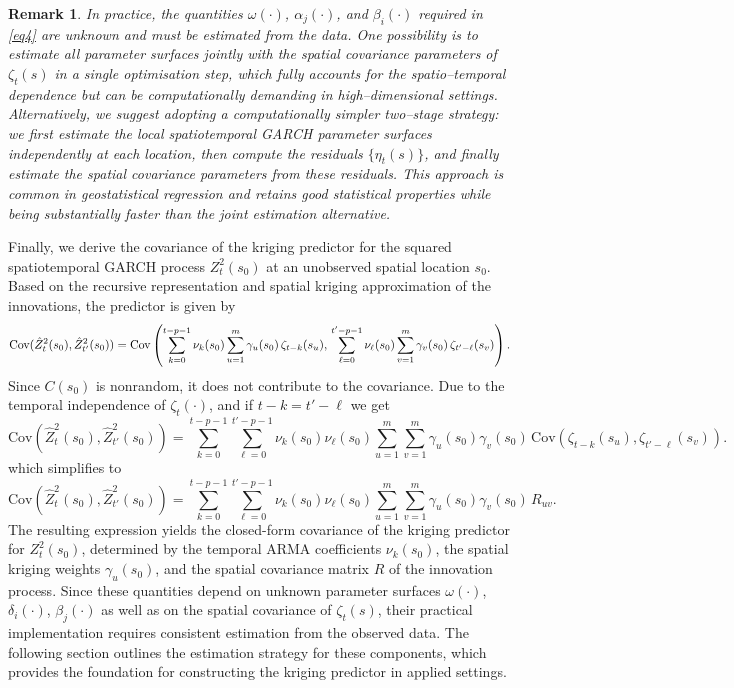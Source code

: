 \documentclass[fleqn,11pt]{article}
\newtheorem{remark}{Remark}
\begin{document}
\begin{remark}\label{rmk:2}
In practice, the quantities $\omega(\cdot)$, $\alpha_j(\cdot)$, and $\beta_i(\cdot)$ required in \eqref{eq4} are unknown and must be estimated from the data. One possibility is to estimate all parameter surfaces jointly with the spatial covariance parameters of $\zeta_t(s)$ in a single optimisation step, which fully accounts for the spatio–temporal dependence but can be computationally demanding in high–dimensional settings.  
Alternatively, we suggest adopting a computationally simpler two–stage strategy: we first estimate the local spatiotemporal GARCH parameter surfaces independently at each location, then compute the residuals $\{\eta_t(s)\}$, and finally estimate the spatial covariance parameters from these residuals. This approach is common in geostatistical regression and retains good statistical properties while being substantially faster than the joint estimation alternative.
\end{remark}


Finally, we derive the covariance of the kriging predictor for the squared spatiotemporal GARCH process \( Z_t^2(s_0) \) at an unobserved spatial location $s_0$. Based on the recursive representation and spatial kriging approximation of the innovations, the predictor is given by 
\begin{equation}
    \text{Cov}(\hat{Z}_t^2(s_0), \hat{Z}_{t'}^2(s_0)) 
= \text{Cov}\left( \sum_{k=0}^{t-p-1} \nu_k(s_0) \sum_{u=1}^m \gamma_u(s_0)\, \zeta_{t-k}(s_u),\,
                    \sum_{\ell=0}^{t'-p-1} \nu_\ell(s_0) \sum_{v=1}^m \gamma_v(s_0)\, \zeta_{t'-\ell}(s_v) \right). \notag 
\end{equation}
Since \( C(s_0) \) is nonrandom, it does not contribute to the covariance. Due to the temporal independence of \( \zeta_t(\cdot) \),  and if $ t-k = t'-\ell $ we get       
\begin{equation}
\text{Cov}(\hat{Z}_t^2(s_0), \hat{Z}_{t'}^2(s_0))  = \sum_{k=0}^{t-p-1} \sum_{\ell=0}^{t'-p-1} \nu_k(s_0)\nu_\ell(s_0)
    \sum_{u=1}^m \sum_{v=1}^m \gamma_u(s_0)\gamma_v(s_0)\,
    \text{Cov}(\zeta_{t-k}(s_u), \zeta_{t'-\ell}(s_v)).
\end{equation}
which simplifies to 
\begin{equation}
\text{Cov}(\hat{Z}_t^2(s_0), \hat{Z}_{t'}^2(s_0)) = \sum_{k=0}^{t-p-1} \sum_{\ell=0}^{t'-p-1} \nu_k(s_0)\nu_\ell(s_0) \sum_{u=1}^m \sum_{v=1}^m \gamma_u(s_0)\gamma_v(s_0)\, R_{uv}.
\end{equation}
The resulting expression yields the closed-form covariance of the kriging predictor for $Z_t^2(s_0)$, determined by the temporal ARMA coefficients $\nu_k(s_0)$, the spatial kriging weights $\gamma_u(s_0)$, and the spatial covariance matrix $R$ of the innovation process. Since these quantities depend on unknown parameter surfaces $\omega(\cdot)$, $\delta_i(\cdot)$, $\beta_j(\cdot)$ as well as on the spatial covariance of $\zeta_t(s)$, their practical implementation requires consistent estimation from the observed data. The following section outlines the estimation strategy for these components, which provides the foundation for constructing the kriging predictor in applied settings.
\end{document}
